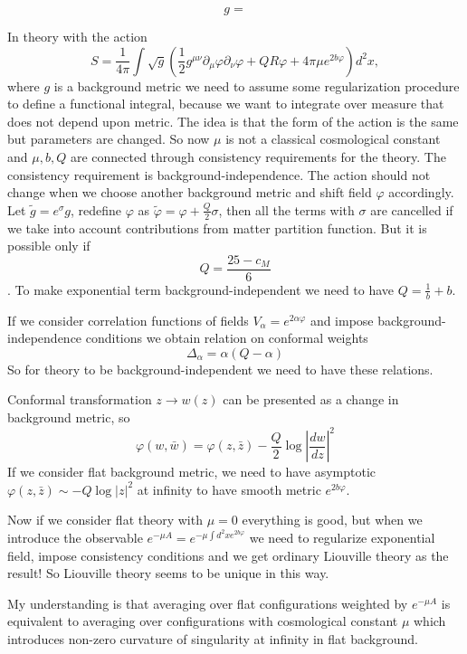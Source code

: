\documentclass[12pt]{article}
\begin{document}
\begin{equation}
  \label{eq:89}
  g=
\end{equation}



In theory with the action
$$S=\frac{1}{4\pi} \int \sqrt{g}\left( \frac{1}{2} g^{\mu\nu} \partial_{\mu} \varphi \partial_{\nu}
  \varphi + Q R\varphi + 4\pi\mu e^{2b\varphi}\right) d^{2}x,$$ 
where $g$ is a background metric we need to assume some regularization procedure to define a
functional integral, because we want to integrate over measure that does not depend upon metric.
The idea is that the form of the action is the same but parameters are changed. 
So now $\mu$ is not a classical cosmological constant and $\mu,b,Q$ are connected through
consistency requirements for the theory. 
The consistency requirement is background-independence. The action should not change when we choose
another background metric and shift field $\varphi$ accordingly. 
Let $\tilde g = e^{\sigma} g$, redefine $\varphi$ as $\tilde \varphi=\varphi + \frac{Q}{2}\sigma$,
then all the terms with $\sigma$ are cancelled if we take into account contributions from matter
partition function. But it is possible only if 
$$Q=\frac{25-c_{M}}{6}$$. 
To make exponential term background-independent we need to have $Q=\frac{1}{b}+b$. 

If we consider correlation functions of fields $V_{\alpha}=e^{2\alpha\varphi}$ and impose
background-independence conditions we obtain relation on conformal weights
$$\Delta_{\alpha}=\alpha(Q-\alpha)$$
So for theory to be background-independent we need to have these relations. 

Conformal transformation $z\to w(z)$ can be presented as a change in background metric, so 
$$\varphi(w,\bar w) = \varphi(z,\bar z) -\frac{Q}{2}\log \left|\frac{dw}{dz}\right|^{2}$$
If we consider flat background metric, we need to have asymptotic $\varphi(z,\bar z)\sim -Q \log
|z|^{2}$ at infinity to have smooth metric $e^{2b\varphi}$. 


Now if we consider flat theory with $\mu=0$ everything is good, but when we introduce the observable
$e^{-\mu A}=e^{-\mu \int d^{2}x e^{2b\varphi}}$ we need to regularize exponential field, impose
consistency conditions and we get ordinary Liouville theory as the result! 
So Liouville theory seems to be unique in this way. 

My understanding is that averaging over flat configurations weighted by $e^{-\mu A}$ is equivalent
to averaging over configurations with cosmological constant $\mu$ which introduces non-zero
curvature of singularity at infinity in flat background. 
\end{document}
